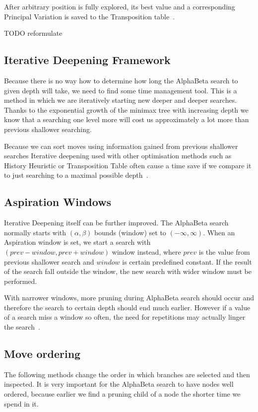 After arbitrary position is fully explored, its best value and a corresponding
Principal Variation is saved to the Transposition table~\cite{COX}.

TODO reformulate

\subsection{Iterative Deepening Framework}
Because there is no way how to determine how long the AlphaBeta search to
given depth will take, we need to find some time management tool. This is a
method in which we are iteratively starting new deeper and deeper searches.
Thanks to the exponential growth of the minimax tree with increasing depth we
know that a searching one level more will cost us approximately a lot more than
previous shallower searching.

Because we can sort moves using information gained from previous shallower
searches Iterative deepening used with other optimisation methods such as
History Heuristic or Transposition Table often cause a time save if we compare
it to just searching to a maximal possible depth~\cite{COX}.

\subsection{Aspiration Windows}
Iterative Deepening itself can be further improved. The AlphaBeta search
normally starts with $(\alpha,\beta)$ bounds (window) set to
$(-\infty,\infty)$. When an Aspiration window is set, we start a search with
$(prev - window, prev + window)$ window instead, where $prev$ is the value from
previous shallower search and $window$ is certain predefined constant. If the
result of the search fall outside the window, the new search with wider window
must be performed.

With narrower windows, more pruning during AlphaBeta search should occur and
therefore the search to certain depth should end much earlier. However if a
value of a search miss a window so often, the need for repetitions may actually
linger the search~\cite{AspirationWindow}.


\subsection{Move ordering}
The following methods change the order in which branches are selected and then
inspected. It is very important for the AlphaBeta search to have nodes well
ordered, because earlier we find a pruning child of a node the shorter time
we spend in it.

